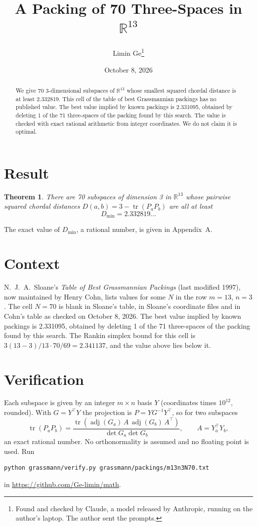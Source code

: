 \documentclass[11pt,a4paper]{article}
\title{A Packing of 70 Three-Spaces in $\mathbb{R}^{13}$}
\author{Limin Ge\thanks{Found and checked by Claude, a model released by Anthropic, running on the author's laptop. The author sent the prompts.}}
\date{October 8, 2026}
\newtheorem*{theorem}{Theorem}
\begin{document}
\maketitle
\begin{abstract}
We give 70 3-dimensional subspaces of $\mathbb{R}^{13}$ whose smallest squared chordal distance is at least 2.332819. This cell of the table of best Grassmannian packings has no published value. The best value implied by known packings is 2.331095, obtained by deleting 1 of the 71 three-spaces of the packing found by this search. The value is checked with exact rational arithmetic from integer coordinates. We do not claim it is optimal.
\end{abstract}

\section{Result}
\begin{theorem}
There are 70 subspaces of dimension 3 in $\mathbb{R}^{13}$ whose pairwise squared chordal distances $D(a,b) = 3 - \operatorname{tr}(P_aP_b)$ are all at least
\[ D_{\min} = 2.332819\ldots \]
\end{theorem}
The exact value of $D_{\min}$, a rational number, is given in Appendix~A.


\section{Context}
N.~J.~A.~Sloane's \emph{Table of Best Grassmannian Packings} (last modified 1997), now maintained by Henry Cohn, lists values for some $N$ in the row $m=13$, $n=3$. The cell $N=70$ is blank in Sloane's table, in Sloane's coordinate files and in Cohn's table as checked on October 8, 2026. The best value implied by known packings is 2.331095, obtained by deleting 1 of the 71 three-spaces of the packing found by this search. The Rankin simplex bound for this cell is $3(13-3)/13\cdot 70/69 = 2.341137$, and the value above lies below it.


\section{Verification}
Each subspace is given by an integer $m\times n$ basis $Y$ (coordinates times $10^{12}$, rounded). With $G=Y^\top Y$ the projection is $P=YG^{-1}Y^\top$, so for two subspaces
\[ \operatorname{tr}(P_aP_b)=\frac{\operatorname{tr}(\operatorname{adj}(G_a)\,A\,\operatorname{adj}(G_b)\,A^\top)}{\det G_a\det G_b},\qquad A=Y_a^\top Y_b, \]
an exact rational number. No orthonormality is assumed and no floating point is used. Run
\begin{verbatim}
python grassmann/verify.py grassmann/packings/m13n3N70.txt
\end{verbatim}
in \url{https://github.com/Ge-limin/math}.
\end{document}
